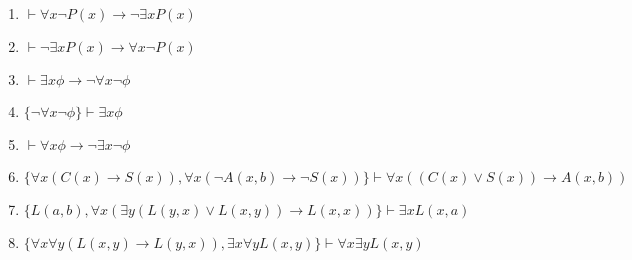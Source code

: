 \begin{enumerate}
    \item \(\vdash \forall x \neg P(x) \rightarrow \neg \exists x P(x)\)
    \item \(\vdash \neg \exists x P(x) \rightarrow \forall x \neg P(x)\)
    \item \(\vdash \exists x \phi \rightarrow \neg \forall x \neg \phi\)
    \item \(\{\neg \forall x \neg \phi\} \vdash \exists x \phi\)
    \item \(\vdash \forall x \phi \rightarrow \neg \exists x \neg \phi\)
    \item \(\{\forall x (C(x) \rightarrow S(x)), \forall x (\neg A(x,b) \rightarrow \neg S(x))\} \vdash \forall x ((C(x) \vee S(x)) \rightarrow A(x,b))\)
    \item \(\{L(a,b), \forall x (\exists y (L(y,x) \vee L(x,y)) \rightarrow L(x,x))\} \vdash \exists x L(x,a)\)
    \item \(\{\forall x \forall y (L(x,y) \rightarrow L(y,x)), \exists x \forall y L(x,y)\} \vdash \forall x \exists y L(x,y)\)
\end{enumerate}

